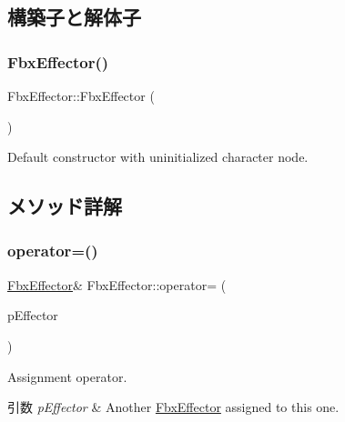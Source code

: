 \subsection{構築子と解体子}
\mbox{\label{class_fbx_effector_affc3f712648fd0a776886da83e562170}} 
\subsubsection{\texorpdfstring{Fbx\+Effector()}{FbxEffector()}}
{\footnotesize\ttfamily Fbx\+Effector\+::\+Fbx\+Effector (\begin{DoxyParamCaption}{ }\end{DoxyParamCaption})}



Default constructor with uninitialized character node. 



\subsection{メソッド詳解}
\mbox{\label{class_fbx_effector_ac4d56e55ec719e7a8e20ac56df22ad0a}} 
\subsubsection{\texorpdfstring{operator=()}{operator=()}}
{\footnotesize\ttfamily \hyperlink{class_fbx_effector}{Fbx\+Effector}\& Fbx\+Effector\+::operator= (\begin{DoxyParamCaption}\item[{const \hyperlink{class_fbx_effector}{Fbx\+Effector} \&}]{p\+Effector }\end{DoxyParamCaption})}

Assignment operator. 
\begin{DoxyParams}{引数}
{\em p\+Effector} & Another \hyperlink{class_fbx_effector}{Fbx\+Effector} assigned to this one. \\
\hline
\end{DoxyParams}
\mbox{\label{class_fbx_effector_a9361ed2afd2c90fd0a74d81467205749}} 
